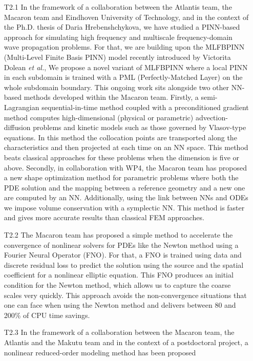 \begin{itemize}
\item[T2.1] In the  framework of a collaboration  between the Atlantis
  team, the Macaron team and Eindhoven  University of  Technology,  and in
  the context of  the Ph.D.  thesis of Daria  Hrebenshchykova, we have
  studied  a PINN-based  approach  for simulating  high frequency  and
  multiscale frequency-domain wave propagation  problems. For that, we
  are building upon the MLFBPINN (Multi-Level Finite Basis PINN) model
  recently introduced by  Victorita Dolean {\em et al.},  We propose a
  novel variant  of MLFBPINN where a  local PINN in each  subdomain is
  trained with a PML (Perfectly-Matched Layer) on the whole subdomain
  boundary. This ongoing work sits alongside two other NN-based methods developed within the Macaron team. Firstly, a semi-Lagrangian sequential-in-time method coupled with a preconditioned gradient method computes high-dimensional (physical or parametric) advection-diffusion problems and kinetic models such as those governed by Vlasov-type equations. In this method the collocation points are transported along the characteristics and then projected at each time on an NN space. This method beats classical approaches for these problems when the dimension is five or above. Secondly, in collaboration with WP4, the Macaron team has proposed a new shape optimization method for parametric problems where both the PDE solution and the mapping between a reference geometry and a new one are computed by an NN. Additionally, using the link between NNs and ODEs we impose volume conservation with a symplectic NN. This method is faster and gives more accurate results than classical FEM approaches.
\item[T2.2]  The Macaron  team has proposed  a simple method  to accelerate
  the convergence of nonlinear solvers for PDEs like the Newton method
  using a Fourier  Neural Operator (FNO).  For that, a  FNO is trained
  using data and discrete residual  loss to predict the solution using
  the  source and  the spatial  coefficient for  a nonlinear  elliptic
  equation. This FNO produces an initial condition for the Newton method, which allows us to capture the coarse scales very quickly. This approach avoids the non-convergence situations that one can face when using the Newton method and delivers between 80 and 200\% of CPU time savings.
\item[T2.3] In  the framework of  a collaboration between  the Macaron
  team, the Atlantis and  the Makutu team and  in the context of a  postdoctoral project, a  nonlinear reduced-order  modeling method has  been proposed

\end{itemize}
